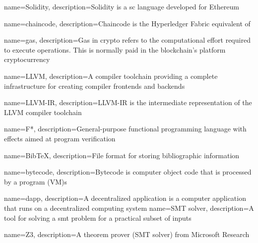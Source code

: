 
\usepackage{xparse}
 {
} %

\newcommand\acrfullr[2][]{\acrshort[#1]{#2} (\acrlong[#1]{#2})}

\makeglossaries %


{
    name=Solidity,
    description={Solidity is a \acrlong{sc} language developed for Ethereum}
}

{
    name=chaincode,
    description={Chaincode is the Hyperledger Fabric equivalent of }
}

{
    name=gas,
    description={Gas in crypto refers to the computational effort required to execute operations. This is normally paid in the blockchain's platform cryptocurrency}
}

{
    name=LLVM,
    description={A compiler toolchain providing a complete infrastructure for creating compiler frontends and backends}
}

{
    name=LLVM-IR,
    description={LLVM-IR is the intermediate representation of the LLVM compiler toolchain}
}

{
    name=F*,
    description={General-purpose functional programming language with effects aimed at program verification}
}

{
    name=BibTeX,
    description={File format for storing bibliographic information}
}

{
    name=bytecode,
    description={Bytecode is computer object code that is processed by a program (VM)s}
}

{
    name=dapp,
    description={A decentralized application is a computer application that runs on a decentralized computing system}
}
{
    name=SMT solver,
    description={A tool for solving a \acrlong{smt} problem for a practical subset of inputs}
}

{
    name=Z3,
    description={A theorem prover (SMT solver) from Microsoft Research}
}

